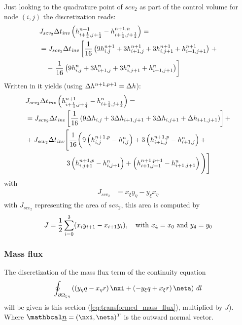 Just looking to the quadrature point of $scv_2$ as part of the control volume for node $(i,j)$ the discretization reads:
\begin{align}
    &J_{scv_2}\Delta t_{\mathit{inv}} \left( h^{n+1}_{i+\frac{1}{4}, j+\frac{1}{4}} -  h^{n+1,n}_{i+\frac{1}{4}, j+\frac{1}{4}} \right) =
    \\*
    &= J_{scv_2}\Delta t_{\mathit{inv}} \left[ \frac{1}{16}\left( 9h^{n+1}_{i, j} + 3 h^{n+1}_{i+1,j}  + 3  h^{n+1}_{i, j+1} + h^{n+1}_{i+1, j+1}\right) \right. +
    \\*
    &\quad - \left. \frac{1}{16}\left( 9 h^{n}_{i, j} +  3 h^{n}_{i+1,j}  + 3  h^{n}_{i, j+1} + h^{n}_{i+1, j+1}\right)\right]
\end{align}
Written in \deltaformulation it yields (using $\Delta h^{n+1,p+1} = \Delta h$):
\begin{align}
    &J_{scv_2}\Delta t_{\mathit{inv}} \left( h^{n+1}_{i+\frac{1}{4}, j+\frac{1}{4}} -  h^{n}_{i+\frac{1}{4}, j+\frac{1}{4}} \right) =
    \\*
    &=J_{scv_2}\Delta t_{\mathit{inv}} \left[ \frac{1}{16}\left( 9 \Delta h_{i, j} + 3 \Delta h_{i+1,j+1}  + 3 \Delta h_{i, j+1} + \Delta h_{i+1, j+1}\right) \right] +
    \nonumber \\*
    & + J_{scv_2}\Delta t_{\mathit{inv}} \Bigg[ \frac{1}{16}\bigg(
     9 \left( h^{n+1,p}_{i, j} - h^{n}_{i, j}\right) +
     3 \left( h^{n+1,p}_{i+1,j} - h^{n}_{i+1,j}\right)  +
    \nonumber \\*
    & \qquad \qquad \qquad 3 \left(h^{n+1,p}_{i, j+1} - h^{n}_{i, j+1}\right) +
     \left(h^{n+1,p+1}_{i+1, j+1} - h^{n}_{i+1, j+1}\right) \Bigg) \Bigg]
\end{align}
with
\begin{align}
    J_{scv_2} &= x_\xi y_\eta - y_\xi x_\eta
\end{align}
with  $J_{scv_2}$ representing the area of $scv_2$, this area is computed
by
\begin{align}
    J = \frac{1}{2} \sum_{i=0}^{3} (x_{i} y_{i+1}  - x_{i+1} y_{i}),
    \quad \text{with } x_4 = x_0 \text{ and } y_4 = y_0
\end{align}

\subsubsection{Mass flux}
The discretization of the mass flux term of the continuity equation
\begin{align}
    \oint_{\partial\Omega_{\xi\eta}} \left( \left( y_{\eta} q - x_{\eta} r \right)\nxi + \left( -y_{\xi} q + x_{\xi} r \right) \neta \right)\, dl
\end{align}
will be given is this section (\autoref{eq:transformed_mass_flux}), multiplied by $J$).
Where $\vecn = (\nxi, \neta)^T$ is the outward normal vector.

